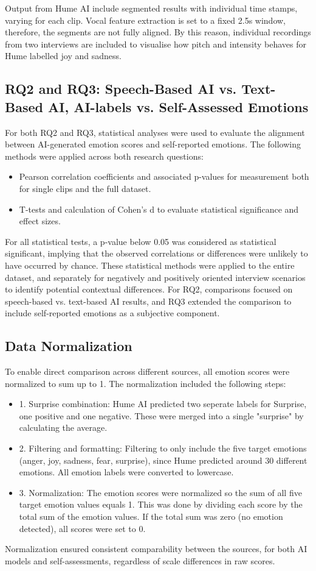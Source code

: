 Output from Hume AI include segmented results with individual time stamps, varying for each clip. Vocal feature extraction is set to a fixed 2.5s window, therefore, the segments are not fully aligned. 
By this reason, individual recordings from two interviews are included to visualise how pitch and intensity behaves for Hume labelled joy and sadness. 

\subsection{RQ2 and RQ3: Speech-Based AI vs. Text-Based AI, AI-labels vs. Self-Assessed Emotions}
For both RQ2 and RQ3, statistical analyses were used to evaluate the alignment between AI-generated emotion scores and self-reported emotions. The following methods were applied across both research questions:
\begin{itemize}
    \item Pearson correlation coefficients and associated p-values for measurement both for single clips and the full dataset. 
    \item T-tests and calculation of Cohen's d to evaluate statistical significance and effect sizes. 
\end{itemize}
For all statistical tests, a p-value below 0.05 was considered as statistical significant, implying that the observed correlations or differences were unlikely to have occurred by chance. 
These statistical methods were applied to the entire dataset, and separately for negatively and positively oriented interview scenarios to identify potential contextual differences.
For RQ2, comparisons focused on speech-based vs. text-based AI results, and RQ3 extended the comparison to include self-reported emotions as a subjective component.

\subsection{Data Normalization}
To enable direct comparison across different sources, all emotion scores were normalized to sum up to 1. The normalization included the following steps: 
\begin{itemize}
    \item 1. Surprise combination: Hume AI predicted two seperate labels for Surprise, one positive and one negative. These were merged into a single "surprise" by calculating the average. 
    \item 2. Filtering and formatting: Filtering to only include the five target emotions (anger, joy, sadness, fear, surprise), since Hume predicted around 30 different emotions. All emotion labels were converted to lowercase. 
    \item 3. Normalization: The emotion scores were normalized so the sum of all five target emotion values equals 1. This was done by dividing each score by the total sum of the emotion values. If the total sum was zero (no emotion detected), all scores were set to 0. 
\end{itemize}
Normalization ensured consistent comparability between the sources, for both AI models and self-assessments, regardless of scale differences in raw scores. 
